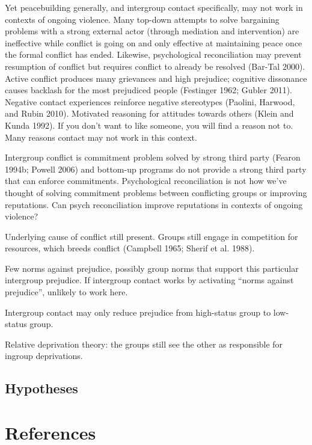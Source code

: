 \documentclass[11pt]{article}
\begin{document}
Yet peacebuilding generally, and intergroup contact specifically, may
not work in contexts of ongoing violence. Many top-down attempts to
solve bargaining problems with a strong external actor (through
mediation and intervention) are ineffective while conflict is going on
and only effective at maintaining peace once the formal conflict has
ended. Likewise, psychological reconciliation may prevent resumption of
conflict but requires conflict to already be resolved (Bar-Tal 2000).
Active conflict produces many grievances and high prejudice; cognitive
dissonance causes backlash for the most prejudiced people (Festinger
1962; Gubler 2011). Negative contact experiences reinforce negative
stereotypes (Paolini, Harwood, and Rubin 2010). Motivated reasoning for
attitudes towards others (Klein and Kunda 1992). If you don't want to
like someone, you will find a reason not to. Many reasons contact may
not work in this context.

Intergroup conflict is commitment problem solved by strong third party
(Fearon 1994b; Powell 2006) and bottom-up programs do not provide a
strong third party that can enforce commitments. Psychological
reconciliation is not how we've thought of solving commitment problems
between conflicting groups or improving reputations. Can psych
reconciliation improve reputations in contexts of ongoing violence?

Underlying cause of conflict still present. Groups still engage in
competition for resources, which breeds conflict (Campbell 1965; Sherif
et al. 1988).

Few norms against prejudice, possibly group norms that support this
particular intergroup prejudice. If intergroup contact works by
activating ``norms against prejudice'', unlikely to work here.

Intergroup contact may only reduce prejudice from high-status group to
low-status group.

Relative deprivation theory: the groups still see the other as
responsible for ingroup deprivations.

\subsection{Hypotheses}\label{hypotheses}

\section{References}\label{references}
\end{document}
